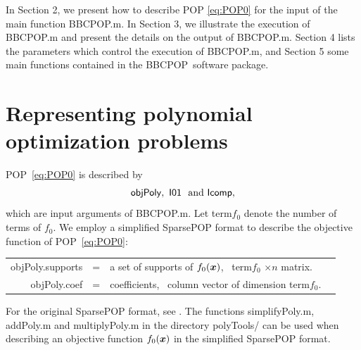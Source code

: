 \documentclass[12pt]{article}
\def\x{\mbox{\boldmath $x$}}
\def\matBP{BBCPOP}
\begin{document}
In Section 2, we present how to describe POP \eqref{eq:POP0} for the input of the main function \matBP.m. In Section 3, 
we illustrate the execution of \matBP.m and present the details on the output of \matBP.m. Section 4 lists the parameters 
which control the execution of \matBP.m, and Section 5 some main functions contained in the \matBP\ software package.


\section{Representing polynomial optimization problems}

\label{Representation}

POP~\eqref{eq:POP0} is described by
\begin{eqnarray*}
{\sf objPoly}, \ {\sf I01} \ \mbox{ and } {\sf Icomp},
\end{eqnarray*}
which are input arguments of  \matBP.m. 
Let term$f_0$ denote the number of terms of $f_0$. 
We employ a simplified SparsePOP format to describe the objective function of POP~\eqref{eq:POP0}: 
\begin{center}
\begin{tabular}{rcll}
{\sf objPoly.supports}		& = & a set of supports of $f_0(\x)$, %
\ term$f_0$ $\times n$ matrix. \\
{\sf objPoly.coef}			& = & coefficients, %
\ column vector of dimension term$f_0$. \\
\end{tabular}
\end{center}
For the original SparsePOP format, see \cite{SPARSEPOP_UG}. 
The functions simplifyPoly.m, 
addPoly.m and multiplyPoly.m in the directory polyTools/  can be used  %
when describing an objective function $f_0(\x)$  %
in the simplified SparsePOP format. 
\end{document}
